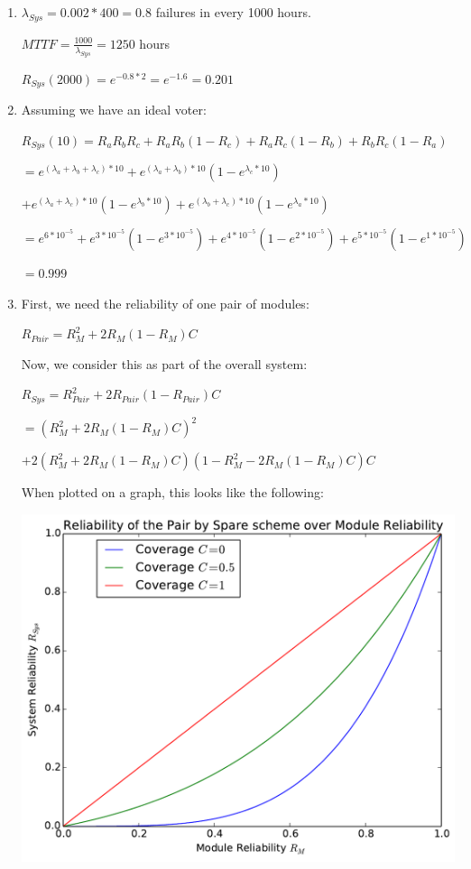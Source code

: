 \documentclass[a4paper,12pt]{article}
\begin{document}
\begin{enumerate}
        \item $\lambda_{Sys} = 0.002 * 400 = 0.8$ failures in every 1000 hours.

        $MTTF = \frac{1000}{\lambda_{Sys}} = 1250$ hours

        $R_{Sys}(2000) = e^{-0.8 * 2} = e^{-1.6} = 0.201$

        \item Assuming we have an ideal voter:

        $R_{Sys}(10) = R_aR_bR_c + R_aR_b(1 - R_c) + R_aR_c(1 - R_b) + R_bR_c(1 - R_a)$

        $= e^{(\lambda_a + \lambda_b + \lambda_c)*10} + e^{(\lambda_a + \lambda_b)*10}(1 - e^{\lambda_c*10})$

        $+ e^{(\lambda_a + \lambda_c)*10}(1 - e^{\lambda_b*10}) + e^{(\lambda_b + \lambda_c)*10}(1 - e^{\lambda_a*10})$

        $= e^{6*10^{-5}} + e^{3*10^{-5}}(1 - e^{3*10^{-5}}) + e^{4*10^{-5}}(1 - e^{2*10^{-5}}) + e^{5*10^{-5}}(1 - e^{1*10^{-5}})$

        $ = 0.999$

        \item First, we need the reliability of one pair of modules:

        $R_{Pair} = R_M^2 + 2R_M(1 - R_M)C$

        Now, we consider this as part of the overall system:

        $R_{Sys} = R_{Pair}^2 + 2R_{Pair}(1 - R_{Pair})C$

        $= (R_M^2 + 2R_M(1 - R_M)C)^2$

        $+ 2(R_M^2 + 2R_M(1 - R_M)C)(1 - R_M^2 - 2R_M(1 - R_M)C)C$

        When plotted on a graph, this looks like the following:

        \begin{center}
        \includegraphics[scale=0.7]{question_6_graph}
        \end{center}


\end{enumerate}
\end{document}
